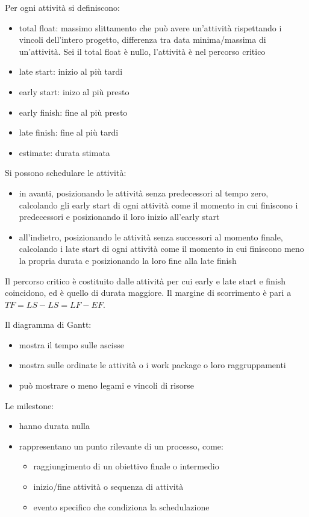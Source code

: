 \documentclass[answers, a4paper, 11pt]{exam}
\begin{document}
Per ogni attività si definiscono:

\begin{itemize}
    \item total float: massimo slittamento che può avere un'attività rispettando i vincoli dell'intero progetto, differenza tra data minima/massima di un'attività. Sei il total float è nullo, l'attività è nel percorso critico
    \item late start: inizio al più tardi
    \item early start: inizo al più presto
    \item early finish: fine al più presto
    \item late finish: fine al più tardi
    \item estimate: durata stimata
\end{itemize}

Si possono schedulare le attività:

\begin{itemize}
    \item in avanti, posizionando le attività senza predecessori al tempo zero, calcolando gli early start di ogni attività come il momento in cui finiscono i predecessori e posizionando il loro inizio all'early start
    \item all'indietro, posizionando le attività senza successori al momento finale, calcolando i late start di ogni attività come il momento in cui finiscono meno la propria durata e posizionando la loro fine alla late finish
\end{itemize}

Il percorso critico è costituito dalle attività per cui early e late start e finish coincidono, ed è quello di durata maggiore.
Il margine di scorrimento è pari a $TF = LS - LS = LF - EF$.

Il diagramma di Gantt:

\begin{itemize}
    \item mostra il tempo sulle ascisse
    \item mostra sulle ordinate le attività o i work package o loro raggruppamenti
    \item può mostrare o meno legami e vincoli di risorse
\end{itemize}

Le milestone:

\begin{itemize}
    \item hanno durata nulla
    \item rappresentano un punto rilevante di un processo, come:
    \begin{itemize}
    \item raggiungimento di un obiettivo finale o intermedio
    \item inizio/fine attività o sequenza di attività
    \item evento specifico che condiziona la schedulazione
    \end{itemize}
\end{itemize}
\end{document}
